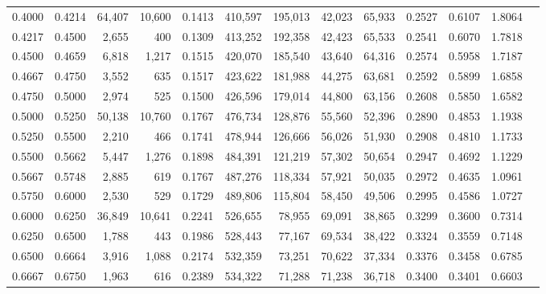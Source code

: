 \begin{tabular}{rrrrrrrrrrrrr}
0.4000 & 0.4214 & 64,407 & 10,600 &                                     0.1413 & 410,597 & 195,013 &  42,023 &  65,933 & 0.2527 & 0.6107 & 1.8064 \\
0.4217 & 0.4500 &  2,655 &    400 &                                     0.1309 & 413,252 & 192,358 &  42,423 &  65,533 & 0.2541 & 0.6070 & 1.7818 \\
0.4500 & 0.4659 &  6,818 &  1,217 &                                     0.1515 & 420,070 & 185,540 &  43,640 &  64,316 & 0.2574 & 0.5958 & 1.7187 \\
0.4667 & 0.4750 &  3,552 &    635 &                                     0.1517 & 423,622 & 181,988 &  44,275 &  63,681 & 0.2592 & 0.5899 & 1.6858 \\
0.4750 & 0.5000 &  2,974 &    525 &                                     0.1500 & 426,596 & 179,014 &  44,800 &  63,156 & 0.2608 & 0.5850 & 1.6582 \\
0.5000 & 0.5250 & 50,138 & 10,760 &                                     0.1767 & 476,734 & 128,876 &  55,560 &  52,396 & 0.2890 & 0.4853 & 1.1938 \\
0.5250 & 0.5500 &  2,210 &    466 &                                     0.1741 & 478,944 & 126,666 &  56,026 &  51,930 & 0.2908 & 0.4810 & 1.1733 \\
0.5500 & 0.5662 &  5,447 &  1,276 &                                     0.1898 & 484,391 & 121,219 &  57,302 &  50,654 & 0.2947 & 0.4692 & 1.1229 \\
0.5667 & 0.5748 &  2,885 &    619 &                                     0.1767 & 487,276 & 118,334 &  57,921 &  50,035 & 0.2972 & 0.4635 & 1.0961 \\
0.5750 & 0.6000 &  2,530 &    529 &                                     0.1729 & 489,806 & 115,804 &  58,450 &  49,506 & 0.2995 & 0.4586 & 1.0727 \\
0.6000 & 0.6250 & 36,849 & 10,641 &                                     0.2241 & 526,655 &  78,955 &  69,091 &  38,865 & 0.3299 & 0.3600 & 0.7314 \\
0.6250 & 0.6500 &  1,788 &    443 &                                     0.1986 & 528,443 &  77,167 &  69,534 &  38,422 & 0.3324 & 0.3559 & 0.7148 \\
0.6500 & 0.6664 &  3,916 &  1,088 &                                     0.2174 & 532,359 &  73,251 &  70,622 &  37,334 & 0.3376 & 0.3458 & 0.6785 \\
0.6667 & 0.6750 &  1,963 &    616 &                                     0.2389 & 534,322 &  71,288 &  71,238 &  36,718 & 0.3400 & 0.3401 & 0.6603 \\

\end{tabular}
